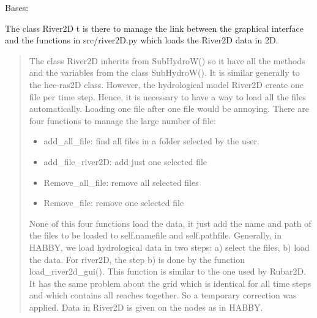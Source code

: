 \documentclass[letterpaper,10pt,english]{sphinxmanual}
\begin{document}
\begin{fulllineitems}
\label{\detokenize{index:src_GUI.hydro_GUI_2.River2D}}
Bases: {\hyperref[\detokenize{index:src_GUI.hydro_GUI_2.SubHydroW}]{}}

The class River2D t is there to manage the link between the graphical interface and the functions in src/river2D.py
which loads the River2D data in 2D.

\begin{quote}

The class River2D inherits from SubHydroW() so it have all the methods and the variables from the class SubHydroW().
It is similar generally to the hec-ras2D class. However, the hydrological model River2D create one file per time step.
Hence, it is necessary to have a way to load all the files automatically. Loading one file after one file would be
annoying. There are four functions to manage the large number of file:
\begin{itemize}
\item {} 
add\_all\_file: find all files in a folder selected by the user.

\item {} 
add\_file\_river2D: add just one selected file

\item {} 
Remove\_all\_file: remove all selected files

\item {} 
Remove\_file: remove one selected file

\end{itemize}

None of this four functions load the data, it just add the name and path of the files to be loaded to
self.namefile and self.pathfile. Generally, in HABBY, we load hydrological data in two steps: a) select the files,
b) load the data. For river2D, the step b) is done by the function load\_river2d\_gui().
This function is similar to the one used by Rubar2D. It has the same problem about the grid which
is identical for all time steps and which contains all reaches together. So a temporary correction was applied.
Data in River2D is given on the nodes as in HABBY.
\end{quote}


\end{fulllineitems}
\end{document}
